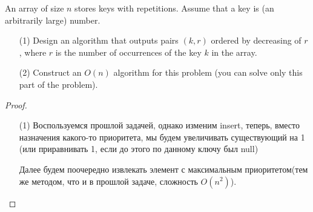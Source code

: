 \begin{prob}
An array of size $n$ stores keys with repetitions. Assume that a key is (an arbitrarily large) number.
\begin{itemize}
\item[(1)] Design an algorithm that outputs pairs $(k, r)$ ordered by decreasing of $r$, where $r$ is the number of occurrences of the key $k$ in the array.
\item[(2)] Construct an $O(n)$ algorithm for this problem (you can solve only this part of the problem).
\end{itemize}
\end{prob}
\vskip 0.2in
\begin{proof}
\begin{itemize}
\item[(1)] Воспользуемся прошлой задачей, однако изменим insert, теперь, вместо назначения какого-то приоритета, мы будем увеличивать существующий на 1 (или приравнивать 1, если до этого по данному ключу был null)

    Далее будем поочередно извлекать элемент с максимальным приоритетом(тем же методом, что и в прошлой задаче, сложность $O(n^2)$).
\end{itemize}
\end{proof}